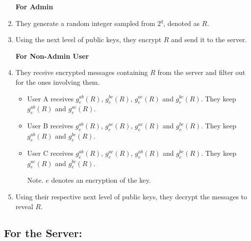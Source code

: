 \documentclass[sigconf]{acmart}
\begin{document}
\begin{enumerate}
    \textbf{For Admin}
    
    \item They generate a random integer sampled from $2^q$, denoted as $R$.
    \item Using the next level of public keys, they encrypt $R$ and send it to the server.

    \textbf{For Non-Admin User}

    \item They receive encrypted messages containing $R$ from the server and filter out for the ones involving them.
        \begin{itemize}
            \item User A receives $g^{ab}_{e}(R)$, $g^{bc}_{e}(R)$, $g^{ac}_{e}(R)$ and $g^{bc}_{e}(R)$. They keep $g^{ab}_{e}(R)$ and $g^{ac}_{e}(R)$.

            \item User B receives $g^{ab}_{e}(R)$, $g^{ac}_{e}(R)$, $g^{ac}_{e}(R)$ and $g^{bc}_{e}(R)$. They keep $g^{ab}_{e}(R)$ and $g^{bc}_{e}(R)$.

            \item User C receives $g^{ab}_{e}(R)$, $g^{ac}_{e}(R)$, $g^{ab}_{e}(R)$ and $g^{bc}_{e}(R)$. They keep $g^{ac}_{e}(R)$ and $g^{bc}_{e}(R)$.
            
            Note. $e$ denotes an encryption of the key.
        \end{itemize}
            
    \item Using their respective next level of public keys, they decrypt the messages to reveal $R$.
            
\end{enumerate}

\subsection*{For the Server:}
\end{document}
